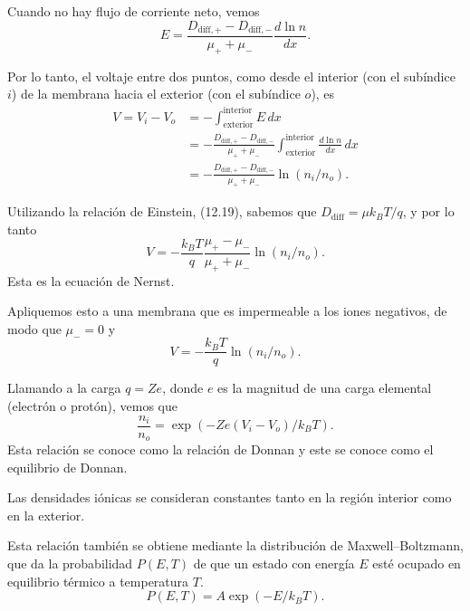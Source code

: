 \documentclass[12pt]{book}
\begin{document}
Cuando no hay flujo de corriente neto, vemos
\begin{equation}
E = \frac{D_{\text{diff},+} - D_{\text{diff},-}}{\mu_+ + \mu_-} \frac{d \ln n}{dx}. \label{eq:12.22}
\end{equation}

Por lo tanto, el voltaje entre dos puntos, como desde el interior (con el subíndice $i$) de la membrana hacia el exterior (con el subíndice $o$), es
\begin{align}
V = V_i - V_o &= - \int_{\text{exterior}}^{\text{interior}} E \, dx \label{eq:12.23} \\
&= - \frac{D_{\text{diff},+} - D_{\text{diff},-}}{\mu_+ + \mu_-} \int_{\text{exterior}}^{\text{interior}} \frac{d \ln n}{dx} \, dx \label{eq:12.24} \\
&= - \frac{D_{\text{diff},+} - D_{\text{diff},-}}{\mu_+ + \mu_-} \ln(n_i / n_o). \label{eq:12.25}
\end{align}

Utilizando la relación de Einstein, (12.19), sabemos que $D_{\text{diff}} = \mu k_B T / q$, y por lo tanto
\begin{equation}
V = -\frac{k_B T}{q} \frac{\mu_+ - \mu_-}{\mu_+ + \mu_-} \ln(n_i / n_o). \label{eq:12.26}
\end{equation}
Esta es la ecuación de Nernst.

Apliquemos esto a una membrana que es impermeable a los iones negativos, de modo que $\mu_- = 0$ y
\begin{equation}
V = -\frac{k_B T}{q} \ln(n_i / n_o). \label{eq:12.27}
\end{equation}

Llamando a la carga $q = Ze$, donde $e$ es la magnitud de una carga elemental (electrón o protón), vemos que
\begin{equation}
\frac{n_i}{n_o} = \exp\left( -Ze(V_i - V_o)/k_B T \right). \label{eq:12.28}
\end{equation}
Esta relación se conoce como la relación de Donnan y este se conoce como el equilibrio de Donnan.

Las densidades iónicas se consideran constantes tanto en la región interior como en la exterior.

Esta relación también se obtiene mediante la distribución de Maxwell--Boltzmann, que da la probabilidad $P(E, T)$ de que un estado con energía $E$ esté ocupado en equilibrio térmico a temperatura $T$.
\begin{equation}
P(E, T) = A \exp(-E/k_B T). \label{eq:12.29}
\end{equation}
\end{document}
